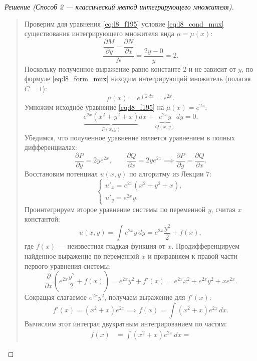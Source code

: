 \begin{proof}[Решение (Способ 2 — классический метод интегрирующего множителя)]~\\
    \begin{quote}
        Проверим для уравнения \eqref{eq:l8_f195} условие \eqref{eq:l8_cond_mux}
        существования интегрирующего множителя вида $\mu = \mu(x)$:
        \[
            \frac{\dfrac{\partial M}{\partial y} -
            \dfrac{\partial N}{\partial x}}{N} = \frac{2y - 0}{y} = 2.
        \]
        Поскольку полученное выражение равно константе $2$ и не зависит от $y$,
        по формуле \eqref{eq:l8_form_mux} находим интегрирующий множитель
        (полагая $C = 1$):
        \[
            \mu(x) = e^{\int 2 \, dx} = e^{2x}.
        \]
        Умножим исходное уравнение \eqref{eq:l8_f195} на $\mu(x) = e^{2x}$:
        \[
            \underbrace{e^{2x} \left(x^2 + y^2 + x\right)}_{P(x, y)} dx +
            \underbrace{e^{2x} y}_{Q(x, y)} \, dy = 0.
        \]
        Убедимся, что полученное уравнение является уравнением в полных
        дифференциалах:
        \[
            \frac{\partial P}{\partial y} = 2y e^{2x}, \qquad
            \frac{\partial Q}{\partial x} = 2y e^{2x} \implies
            \frac{\partial P}{\partial y} = \frac{\partial Q}{\partial x}.
        \]
        Восстановим потенциал $u(x, y)$ по алгоритму из Лекции 7:
        \[
            \begin{cases}
                u'_x = e^{2x} \left(x^2 + y^2 + x\right), \\[1mm]
                u'_y = e^{2x} y.
            \end{cases}
        \]
        Проинтегрируем второе уравнение системы по переменной $y$, считая $x$
        константой:
        \[
            u(x, y) = \int e^{2x} y \, dy = e^{2x} \frac{y^2}{2} + f(x),
        \]
        где $f(x)$ — неизвестная гладкая функция от $x$. Продифференцируем
        найденное выражение по переменной $x$ и приравняем к правой части
        первого уравнения системы:
        \[
            \frac{\partial}{\partial x}
            \left(e^{2x} \frac{y^2}{2} + f(x)\right) =
            e^{2x} y^2 + f'(x) = e^{2x} x^2 + e^{2x} y^2 + x e^{2x}.
        \]
        Сокращая слагаемое $e^{2x} y^2$, получаем выражение для $f'(x)$:
        \[
            f'(x) = \left(x^2 + x\right) e^{2x} \implies
            f(x) = \int \left(x^2 + x\right) e^{2x} \, dx.
        \]
        Вычислим этот интеграл двукратным интегрированием по частям:
        \begin{align*}
            f(x) &= \int \left(x^2 + x\right) e^{2x} \, dx =

\end{align*}
\end{quote}
\end{proof}

